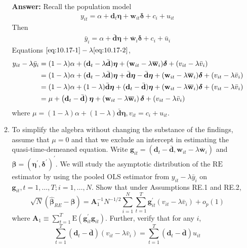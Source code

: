 \begin{enumerate}
\begin{enumerate}
        \textbf{Answer:} Recall the population model
        \begin{gather}
            y_{it}=\alpha+\mathbf{d}_{t} \boldsymbol{\eta}+\mathbf{w}_{i t} \boldsymbol{\delta}+c_{i}+u_{i t} \label{eq:10.17-1}
        \end{gather}
        Then
        \begin{gather}
            \bar{y}_{i}=\alpha+\bar{\mathbf{d}} \boldsymbol{\eta}+\overline{\mathbf{w}}_{i} \boldsymbol{\delta}+c_{i}+\bar{u}_{i} \label{eq:10.17-2}
        \end{gather}
        Equations $\eqref{eq:10.17-1}-\lambda\eqref{eq:10.17-2}$,
        \begin{align}
            y_{it}-\lambda \bar{y}_{i} &= (1-\lambda)\alpha + (\mathbf{d}_t - \lambda\bar{\mathbf{d}})\bm{\eta} + (\mathbf{w}_{it} - \lambda\overline{\mathbf{w}}_i) \bm{\delta} + (v_{it} - \lambda\bar{v}_i) \notag \\
            &= (1-\lambda)\alpha + (\mathbf{d}_t - \lambda\bar{\mathbf{d}})\bm{\eta} + \bar{\mathbf{d}}\bm{\eta} - \bar{\mathbf{d}}\bm{\eta} + (\mathbf{w}_{it} - \lambda\overline{\mathbf{w}}_i) \bm{\delta} + (v_{it} - \lambda\bar{v}_i) \notag \\
            &= (1-\lambda)\alpha + (1-\lambda)\bar{\mathbf{d}}\bm{\eta} + (\mathbf{d}_t - \bar{\mathbf{d}})\bm{\eta} + (\mathbf{w}_{it} - \lambda\overline{\mathbf{w}}_i) \bm{\delta} + (v_{it} - \lambda\bar{v}_i) \notag \\
            &= \mu+\left(\mathbf{d}_{t}-\bar{\mathbf{d}}\right) \boldsymbol{\eta}+\left(\mathbf{w}_{i t}-\lambda \overline{\mathbf{w}}_{i}\right) \boldsymbol{\delta}+\left(v_{i t}-\lambda \bar{v}_{i}\right) \label{eq:10.17-3}
        \end{align}
        where $\mu=(1-\lambda) \alpha+(1-\lambda) \bar{\mathbf{d}} \boldsymbol{\eta}, v_{i t}=c_{i}+u_{i t}$.
        
        \item To simplify the algebra without changing the substance of the findings, assume that $\mu=0$ and that we exclude an intercept in estimating the quasi-time-demeaned equation. Write $\mathbf{g}_{i t}=\left(\mathbf{d}_{t}-\bar{\mathbf{d}}, \mathbf{w}_{i t}-\lambda \overline{\mathbf{w}}_{i}\right)$ and $\boldsymbol{\beta}=\left(\boldsymbol{\eta}^{\prime}, \boldsymbol{\delta}^{\prime}\right)^{\prime}$. We will study the asymptotic distribution of the $\mathrm{RE}$ estimator by using the pooled OLS estimator from $y_{i t}-\lambda \bar{y}_{i}$ on $\mathbf{g}_{i t}, t=1, \ldots, T ; i=1, \ldots, N .$ Show that under Assumptions RE.1 and RE.2,
        \[ \sqrt{N}\left(\hat{\boldsymbol{\beta}}_{R E}-\boldsymbol{\beta}\right)=\mathbf{A}_{1}^{-1} N^{-1 / 2} \sum_{i=1}^{N} \sum_{t=1}^{T} \mathbf{g}_{i t}^{\prime}\left(v_{i t}-\lambda \bar{v}_{i}\right)+o_{p}(1) \]
        where $\displaystyle\mathbf{A}_{1} \equiv \sum_{t=1}^{T} \mathrm{E}\left(\mathbf{g}_{i t}^{\prime} \mathbf{g}_{i t}\right) .$ Further, verify that for any $i$,
        \[ \sum_{t=1}^{T}\left(\mathbf{d}_{t}-\bar{\mathbf{d}}\right)\left(v_{i t}-\lambda \bar{v}_{i}\right)=\sum_{t=1}^{T}\left(\mathbf{d}_{t}-\bar{\mathbf{d}}\right) u_{i t} \]
        

\end{enumerate}
\end{enumerate}
